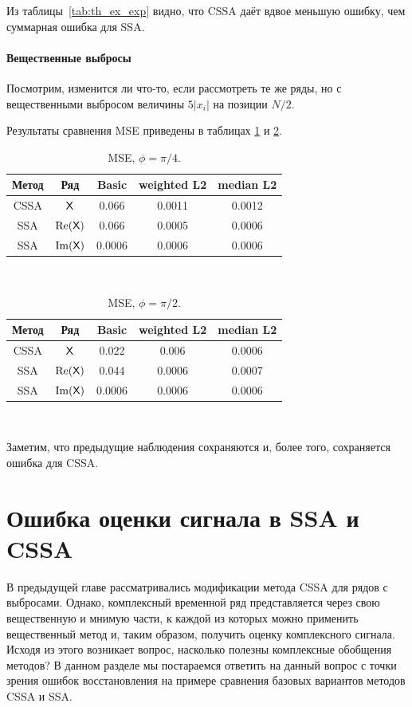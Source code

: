 \documentclass[specialist,
               substylefile = spbu.rtx,
               subf,href,colorlinks=true, 12pt]{disser}
\begin{document}
Из таблицы~\ref{tab:th_ex_exp} видно, что CSSA даёт вдвое меньшую ошибку, чем суммарная ошибка для SSA.

\subsubsection{Вещественные выбросы}
Посмотрим, изменится ли что-то, если рассмотреть те же ряды, но с вещественными выбросом величины $5|x_i|$ на позиции $N/2$.

Результаты сравнения MSE приведены в таблицах \ref{tab:re_outl} и \ref{tab:re_outl_exp}.
\begin{table}[H]
	\caption{MSE, $\phi = \pi/4$.}
	\label{tab:re_outl}
	\begin{center}
		\begin{tabular}{|c|c|c|c|c|}
			\hline
			Метод & Ряд & Basic & weighted L2 & median L2\\
			\hline
			CSSA & $\textsf{X}$ & 0.066 & 0.0011 & 0.0012\\
			\hline
			SSA & $\Re(\textsf{X})$ & 0.066 & 0.0005 &   0.0006\\
			\hline
			SSA & $\Im(\textsf{X})$ & 0.0006   & 0.0006 &   0.0006\\
			\hline
		\end{tabular} \\
	\end{center}
\end{table}

\begin{table}[H]
	\caption{MSE, $\phi = \pi/2$.}
	\label{tab:re_outl_exp}
	\begin{center}
		\begin{tabular}{|c|c|c|c|c|}
			\hline
			Метод & Ряд & Basic & weighted L2 & median L2\\
			\hline
			CSSA & $\textsf{X}$ & 0.022 & 0.006 & 0.0006\\
			\hline
			SSA & $\Re(\textsf{X})$ & 0.044 & 0.0006 &   0.0007\\
			\hline
			SSA & $\Im(\textsf{X})$ & 0.0006   & 0.0006 &   0.0006\\
			\hline
		\end{tabular} \\
	\end{center}
\end{table}

Заметим, что предыдущие наблюдения сохраняются и, более того, сохраняется ошибка для CSSA.

\chapter{Ошибка оценки сигнала в SSA и CSSA}
\label{ch:perturb}
В предыдущей главе рассматривались модификации метода CSSA для рядов с выбросами.
Однако, комплексный временной ряд представляется через свою вещественную и мнимую части, к каждой из которых можно применить вещественный метод и, таким образом, получить оценку комплексного сигнала. Исходя из этого возникает вопрос, насколько полезны комплексные обобщения методов? В данном разделе мы постараемся ответить на данный вопрос с точки зрения ошибок восстановления на примере сравнения базовых вариантов методов CSSA и SSA.
\end{document}
